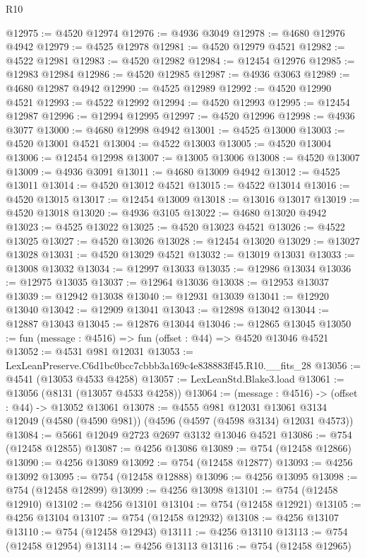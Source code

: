 \begin{lexlean}{R10}
\begin{coremodule}
@12975 := @4520 @12974
@12976 := @4936 @3049
@12978 := @4680 @12976 @4942
@12979 := @4525 @12978
@12981 := @4520 @12979 @4521
@12982 := @4522 @12981
@12983 := @4520 @12982
@12984 := @12454 @12976
@12985 := @12983 @12984
@12986 := @4520 @12985
@12987 := @4936 @3063
@12989 := @4680 @12987 @4942
@12990 := @4525 @12989
@12992 := @4520 @12990 @4521
@12993 := @4522 @12992
@12994 := @4520 @12993
@12995 := @12454 @12987
@12996 := @12994 @12995
@12997 := @4520 @12996
@12998 := @4936 @3077
@13000 := @4680 @12998 @4942
@13001 := @4525 @13000
@13003 := @4520 @13001 @4521
@13004 := @4522 @13003
@13005 := @4520 @13004
@13006 := @12454 @12998
@13007 := @13005 @13006
@13008 := @4520 @13007
@13009 := @4936 @3091
@13011 := @4680 @13009 @4942
@13012 := @4525 @13011
@13014 := @4520 @13012 @4521
@13015 := @4522 @13014
@13016 := @4520 @13015
@13017 := @12454 @13009
@13018 := @13016 @13017
@13019 := @4520 @13018
@13020 := @4936 @3105
@13022 := @4680 @13020 @4942
@13023 := @4525 @13022
@13025 := @4520 @13023 @4521
@13026 := @4522 @13025
@13027 := @4520 @13026
@13028 := @12454 @13020
@13029 := @13027 @13028
@13031 := @4520 @13029 @4521
@13032 := @13019 @13031
@13033 := @13008 @13032
@13034 := @12997 @13033
@13035 := @12986 @13034
@13036 := @12975 @13035
@13037 := @12964 @13036
@13038 := @12953 @13037
@13039 := @12942 @13038
@13040 := @12931 @13039
@13041 := @12920 @13040
@13042 := @12909 @13041
@13043 := @12898 @13042
@13044 := @12887 @13043
@13045 := @12876 @13044
@13046 := @12865 @13045
@13050 := fun (message : @4516) => fun (offset : @44) => @4520 @13046 @4521
@13052 := @4531 @981 @12031
@13053 := LexLeanPreserve.C6d1bc0bcc7cbbb3a169c4e838883ff45.R10.__fits_28
@13056 := @4541 (@13053 @4533 @4258)
@13057 := LexLeanStd.Blake3.load
@13061 := @13056 (@8131 (@13057 @4533 @4258))
@13064 := (message : @4516) -> (offset : @44) -> @13052 @13061
@13078 := @4555
    @981
    @12031
    @13061
    @3134
    @12049
    (@4580 (@4590 @981))
    (@4596 (@4597 (@4598 @3134) @12031 @4573))
@13084 := @5661 @12049 @2723 @2697 @3132 @13046 @4521
@13086 := @754 (@12458 @12855)
@13087 := @4256 @13086
@13089 := @754 (@12458 @12866)
@13090 := @4256 @13089
@13092 := @754 (@12458 @12877)
@13093 := @4256 @13092
@13095 := @754 (@12458 @12888)
@13096 := @4256 @13095
@13098 := @754 (@12458 @12899)
@13099 := @4256 @13098
@13101 := @754 (@12458 @12910)
@13102 := @4256 @13101
@13104 := @754 (@12458 @12921)
@13105 := @4256 @13104
@13107 := @754 (@12458 @12932)
@13108 := @4256 @13107
@13110 := @754 (@12458 @12943)
@13111 := @4256 @13110
@13113 := @754 (@12458 @12954)
@13114 := @4256 @13113
@13116 := @754 (@12458 @12965)

\end{coremodule}
\end{lexlean}
